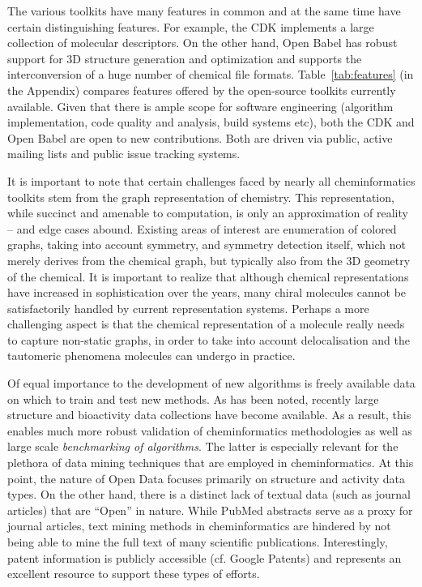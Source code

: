 \documentclass{sig-alternate}
\begin{document}
The various toolkits have many features in common and at the same time
have certain distinguishing features. For example, the CDK implements
a large collection of molecular descriptors. On the other hand, Open
Babel has robust support for 3D structure generation and optimization
and supports the interconversion of a huge number of chemical file
formats. Table~\ref{tab:features} (in the Appendix) compares features
offered by the open-source toolkits currently available.  Given that
there is ample scope for software engineering (algorithm
implementation, code quality and analysis, build systems etc), both
the CDK and Open Babel are open to new contributions. Both are driven
via public, active mailing lists and public issue tracking systems.

It is important to note that certain challenges faced by nearly all
cheminformatics toolkits stem from the graph representation of
chemistry. This representation, while succinct and amenable to
computation, is only an approximation of reality -- and edge cases
abound. Existing areas of interest are enumeration of colored graphs,
taking into account symmetry, and symmetry detection itself, which not
merely derives from the chemical graph, but typically also from the 3D
geometry of the chemical. It is important to realize that although
chemical representations have increased in sophistication over the
years, many chiral molecules cannot be satisfactorily handled by
current representation systems. Perhaps a more challenging aspect is
that the chemical representation of a molecule really needs to capture
non-static graphs, in order to take into account delocalisation and
the tautomeric phenomena molecules can undergo in practice.

Of equal importance to the development of new algorithms is freely
available data on which to train and test new methods. As has been
noted, recently large structure and bioactivity data collections have
become available. As a result, this enables much more robust
validation of cheminformatics methodologies as well as large scale
\emph{benchmarking of algorithms}. The latter is especially relevant
for the plethora of data mining techniques that are employed in
cheminformatics. At this point, the nature of Open Data focuses
primarily on structure and activity data types. On the other hand,
there is a distinct lack of textual data (such as journal articles)
that are ``Open'' in nature. While PubMed abstracts serve as a proxy
for journal articles, text mining methods in cheminformatics are
hindered by not being able to mine the full text of many scientific
publications.  Interestingly, patent information is publicly
accessible (cf. Google Patents) and represents an excellent resource
to support these types of efforts.
\end{document}
